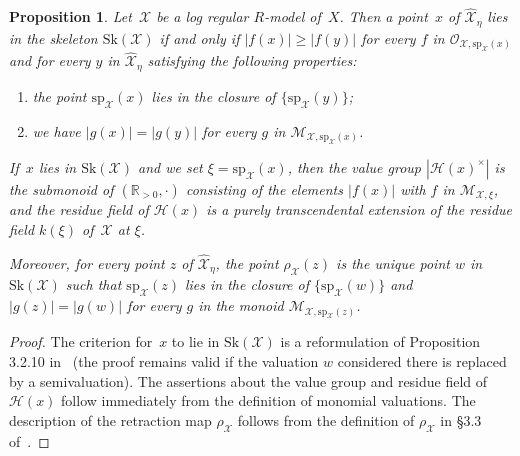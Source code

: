 \documentclass[JEP,XML,SOM,Unicode,NoFloatCountersInSection]{cedram}
\let\mathcal\mathscr
\newtheorem{prop}[equation]{Proposition}
\theoremstyle{definition}
\numberwithin{equation}{subsection}
\newcommand{\R}{\ensuremath{\mathbb{R}}}
\newcommand{\cX}{\ensuremath{\mathscr{X}}}
\newcommand{\Sk}{\mathrm{Sk}}
\newcommand{\spe}{\mathrm{sp}}
\begin{document}
\begin{prop}\label{prop:maxmon}
Let~$\cX$ be a log regular $R$\nobreakdash-model of~$X$. Then a point~$x$ of $\widehat{\cX}_{\eta}$ lies in the skeleton $\Sk(\cX)$ if and only if
$|f(x)|\geq |f(y)|$ for every $f$ in $\mathcal{O}_{\cX,\spe_{\cX}(x)}$ and for every $y$ in $\widehat{\cX}_{\eta}$ satisfying the following properties:
\begin{enumerate}
\item the point $\spe_{\cX}(x)$ lies in the closure of $\{\spe_{\cX}(y)\}$;
\item we have $|g(x)|=|g(y)|$ for every $g$ in $\mathcal{M}_{\cX,\spe_{\cX}(x)}$.
\end{enumerate}
If~$x$ lies in $\Sk(\cX)$ and we set $\xi=\spe_{\cX}(x)$, then the value group $|\mathscr{H}(x)^{\times}|$ is the submonoid of $(\R_{>0},\cdot)$ consisting of the elements $|f(x)|$ with $f$ in $\mathcal{M}_{\cX,\xi}$, and the residue field of $\mathscr{H}(x)$ is a purely transcendental extension of the residue field $k(\xi)$ of~$\cX$ at $\xi$.

Moreover, for every point $z$ of $\widehat{\cX}_{\eta}$, the point $\rho_{\cX}(z)$ is the unique point $w$ in $\Sk(\cX)$ such that $\spe_{\cX}(z)$ lies in the closure of $\{\spe_{\cX}(w)\}$ and $|g(z)|=|g(w)|$ for every $g$ in the monoid $\mathcal{M}_{\cX,\spe_{\cX}(z)}$.
\end{prop}
\begin{proof}
The criterion for~$x$ to lie in $\Sk(\cX)$ is a reformulation of Proposition 3.2.10 in~\cite{BrMa} (the proof remains valid if the valuation $w$ considered there is replaced by a semivaluation). The assertions about the value group and residue field of $\mathscr{H}(x)$ follow immediately from the definition of monomial valuations.
The description of the retraction map $\rho_{\cX}$ follows from the definition of $\rho_{\cX}$ in \S3.3 of~\cite{BrMa}.
\end{proof}
\end{document}
